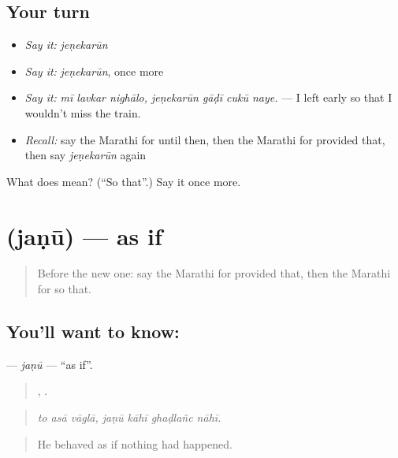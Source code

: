 \subsection*{Your turn}
\begin{itemize}
\raggedright
  \item \emph{Say it:} \emph{jeṇekarūn}
  \item \emph{Say it:} \emph{jeṇekarūn}, once more
  \item \emph{Say it:} \emph{mī lavkar nighālo, jeṇekarūn gāḍī cukū naye.} — I left early so that I wouldn't miss the train.
  \item \emph{Recall:} say the Marathi for until then, then the Marathi for provided that, then say \emph{jeṇekarūn} again
\end{itemize}

\begin{tcolorbox}[breakable,colback=teal!4,colframe=teal!35!black,title={Before you move on}]
What does  mean? (\textquotedblleft{}So that\textquotedblright{}.) Say it once more.
\end{tcolorbox}
\section[\texorpdfstring{\mr{जणू} (jaṇū)}{जणू (jaṇū)}]{ (jaṇū) — as if}

\label{lesson:MR-C381-janu}



\begin{quote}
Before the new one: say the Marathi for provided that, then the Marathi for so that.
\end{quote}

\subsection*{You'll want to know: }
\textbf{} — \emph{jaṇū} — \textquotedblleft{}as if\textquotedblright{}.

\begin{quote}
  ,    .
\end{quote}

\begin{quote}
\emph{to asā vāglā, jaṇū kāhī ghaḍlañc nāhī.}
\end{quote}

\begin{quote}
He behaved as if nothing had happened.
\end{quote}

